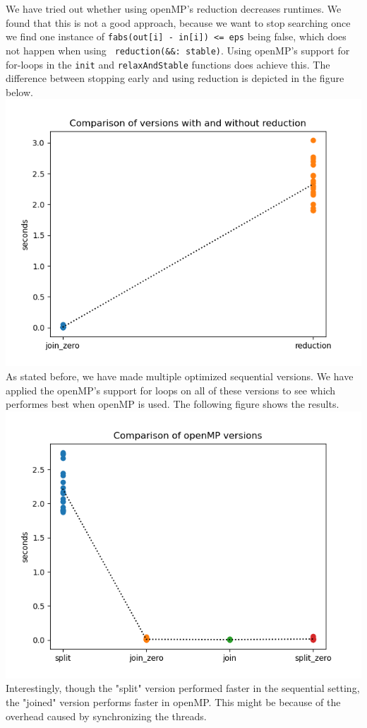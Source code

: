 \documentclass[a4paper]{article}
\begin{document}
We have tried out whether using openMP's reduction decreases runtimes. We found that this is not a good approach, because we want to stop searching once we find one instance of \texttt{fabs(out[i] - in[i]) <= eps} being false, which does not happen when using \texttt{ reduction(\&\&: stable)}. Using openMP's support for for-loops in the \texttt{init} and \texttt{relaxAndStable} functions does achieve this. The difference between stopping early and using reduction is depicted in the figure below.\\
\includegraphics[scale = 0.5]{graphs/Comparison of versions with and without reduction.png}\\

As stated before, we have made multiple optimized sequential versions. We have applied the openMP's support for loops on all of these versions to see which performes best when openMP is used. The following figure shows the results. \\
\includegraphics[scale = 0.5]{graphs/Comparison of openMP versions.png}
\noindent Interestingly, though the "split" version performed faster in the sequential setting, the "joined" version performs faster in openMP.
This might be because of the overhead caused by synchronizing the threads.
\end{document}
